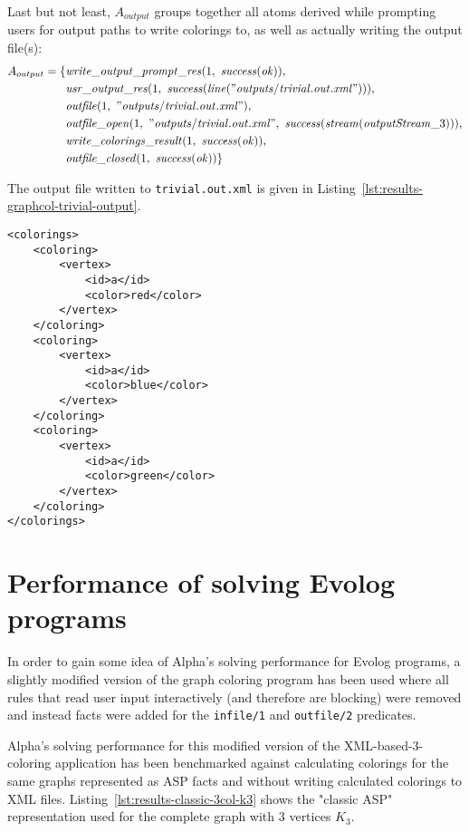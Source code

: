 \begin{example}
Last but not least, $A_{output}$ groups together all atoms derived while prompting users for output paths to write colorings to, as well as actually writing the output file(s):
\begin{align*}
    A_{output} = \{&\mathit{write\_output\_prompt\_res}(1,~\mathit{success}(\mathit{ok})),\\
                   &\mathit{usr\_output\_res}(1,~\mathit{success}(\mathit{line}(\mathit{"outputs/trivial.out.xml"}))),\\
                   &\mathit{outfile}(1,~\mathit{"outputs/trivial.out.xml"}),\\
                   &\mathit{outfile\_open}(1,~\mathit{"outputs/trivial.out.xml"},~\mathit{success}(\mathit{stream}(\mathit{outputStream}\_3))),\\
                   &\mathit{write\_colorings\_result}(1,~\mathit{success}(\mathit{ok})),\\
                   &\mathit{outfile\_closed}(1,~\mathit{success}(\mathit{ok}))\}
\end{align*}

The output file written to \texttt{trivial.out.xml} is given in Listing~\ref{lst:results-graphcol-trivial-output}.

\begin{lstlisting}[style=asp-code, label={lst:results-graphcol-trivial-output}, caption={XML encoding of caluclated colorings for the input file from Listing~\ref{lst:results-graphcol-trivial-input}}]
<colorings>
	<coloring>
		<vertex>
			<id>a</id>
			<color>red</color>
		</vertex>
	</coloring>
	<coloring>
		<vertex>
			<id>a</id>
			<color>blue</color>
		</vertex>
	</coloring>
	<coloring>
		<vertex>
			<id>a</id>
			<color>green</color>
		</vertex>
	</coloring>
</colorings>    
\end{lstlisting}
\end{example}
 

\section{Performance of solving Evolog programs}

In order to gain some idea of Alpha's solving performance for Evolog programs, a slightly modified version of the graph coloring program has been used where all rules that read user input interactively (and therefore are blocking) were removed and instead facts were added for the \texttt{infile/1} and \texttt{outfile/2} predicates.

Alpha's solving performance for this modified version of the XML-based-3-coloring application has been benchmarked against calculating colorings for the same graphs represented as ASP facts and without writing calculated colorings to XML files.
Listing~\ref{lst:results-classic-3col-k3} shows the "classic ASP" representation used for the complete graph with 3 vertices $K_3$.

